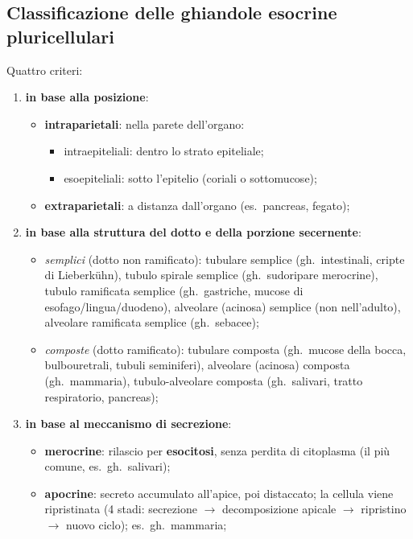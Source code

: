 \subsection{Classificazione delle ghiandole esocrine pluricellulari}
Quattro criteri:
\begin{enumerate}[label=\Alph*)]
  \item \textbf{in base alla posizione}:
    \begin{itemize}
      \item \textbf{intraparietali}: nella parete dell'organo:
        \begin{itemize}
          \item intraepiteliali: dentro lo strato epiteliale;
          \item esoepiteliali: sotto l'epitelio (coriali o sottomucose);
        \end{itemize}
      \item \textbf{extraparietali}: a distanza dall'organo (es.\ pancreas, fegato);
    \end{itemize}
  \item \textbf{in base alla struttura del dotto e della porzione secernente}:
    \begin{itemize}
      \item \textit{semplici} (dotto non ramificato): tubulare semplice (gh.\ intestinali, cripte
        di Lieberkühn), tubulo spirale semplice (gh.\ sudoripare merocrine), tubulo ramificata
        semplice (gh.\ gastriche, mucose di esofago/lingua/duodeno), alveolare (acinosa) semplice
        (non nell'adulto), alveolare ramificata semplice (gh.\ sebacee);
      \item \textit{composte} (dotto ramificato): tubulare composta (gh.\ mucose della bocca,
        bulbouretrali, tubuli seminiferi), alveolare (acinosa) composta (gh.\ mammaria),
        tubulo-alveolare composta (gh.\ salivari, tratto respiratorio, pancreas);
    \end{itemize}
  \item \textbf{in base al meccanismo di secrezione}:
    \begin{itemize}
      \item \textbf{merocrine}: rilascio per \textbf{esocitosi}, senza perdita di citoplasma (il
        più comune, es.\ gh.\ salivari);
      \item \textbf{apocrine}: secreto accumulato all'apice, poi distaccato; la cellula viene
        ripristinata (4 stadi: secrezione $\rightarrow$ decomposizione apicale $\rightarrow$
        ripristino $\rightarrow$ nuovo ciclo); es.\ gh.\ mammaria;

\end{itemize}
\end{enumerate}
